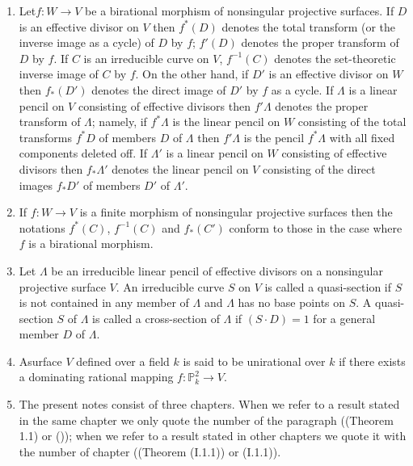 \begin{enumerate}
\item Let\pageoriginale $f:W\to V$ be a birational morphism of nonsingular
  projective surfaces. If $D$ is an effective divisor on $V$ then
  $f^{\ast}(D)$ denotes the total transform (or the inverse image as a
  cycle) of $D$ by $f$; $f'(D)$ denotes the proper transform of $D$ by
  $f$. If $C$ is an irreducible curve on $V$, $f^{-1}(C)$ denotes the
  set-theoretic inverse image of $C$ by $f$. On the other hand, if
  $D'$ is an effective divisor on $W$ then $f_{\ast}(D')$ denotes the
  direct image of $D'$ by $f$ as a cycle. If $\Lambda$ is a linear
  pencil on $V$ consisting of effective divisors then $f'\Lambda$
  denotes the proper transform of $\Lambda$; namely, if
  $f^{\ast}\Lambda$ is the linear pencil on $W$ consisting of the
  total transforms $f^{\ast}D$ of members $D$ of $\Lambda$ then
  $f'\Lambda$ is the pencil $f^{\ast}\Lambda$ with all fixed
  components deleted off. If $\Lambda'$ is a linear pencil on $W$
  consisting of effective divisors then $f_{\ast}\Lambda'$ denotes the
  linear pencil on $V$ consisting of the direct images $f_{\ast}D'$ of
  members $D'$ of $\Lambda'$.

\item If $f:W\to V$ is a finite morphism of nonsingular projective
  surfaces then the notations $f^{\ast}(C)$, $f^{-1}(C)$ and
  $f_{\ast}(C')$ conform to those in the case where $f$ is a
  birational morphism.

\item Let $\Lambda$ be an irreducible linear pencil of effective
  divisors on a nonsingular projective surface $V$. An irreducible
  curve $S$ on $V$ is called a quasi-section if $S$ is not contained
  in any member of $\Lambda$ and $\Lambda$ has no base points on
  $S$. A quasi-section $S$ of $\Lambda$ is called a cross-section of
  $\Lambda$ if $(S\cdot D)=1$ for a general member $D$ of $\Lambda$.

\item A\pageoriginale surface $V$ defined over a field $k$ is said to
  be unirational over $k$ if there exists a dominating rational
  mapping $f:\mathbb{P}^{2}_{k}\to V$.

\item The present notes consist of three chapters. When we refer to a
  result stated in the same chapter we only quote the number of the
  paragraph (\eg (\cf Theorem 1.1) or ()); when we refer to a
  result stated in other chapters we quote it with the number of
  chapter (\eg (\cf Theorem (I.1.1)) or (\cf I.1.1)).
\end{enumerate}
